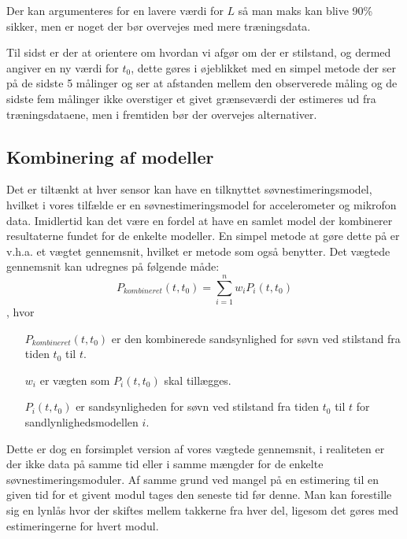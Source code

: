 Der kan argumenteres for en lavere værdi for $L$ så man maks kan blive 90\% sikker, men er noget der bør overvejes med mere træningsdata.

Til sidst er der at orientere om hvordan vi afgør om der er stilstand, og dermed angiver en ny værdi for $t_0$, dette gøres i øjeblikket med en simpel metode der ser på de sidste 5 målinger og ser at afstanden mellem den observerede måling og de sidste fem målinger ikke overstiger et givet grænseværdi der estimeres ud fra træningsdataene, men i fremtiden bør der overvejes alternativer.

\subsection{Kombinering af modeller}
Det er tiltænkt at hver sensor kan have en tilknyttet søvnestimeringsmodel, hvilket i vores tilfælde er en søvnestimeringsmodel for accelerometer og mikrofon data.
Imidlertid kan det være en fordel at have en samlet model der kombinerer resultaterne fundet for de enkelte modeller.
En simpel metode at gøre dette på er v.h.a. et vægtet gennemsnit, hvilket er metode som \citet{6563918} også benytter.
Det vægtede gennemsnit kan udregnes på følgende måde:
\begin{equation}
	P_{kombineret}(t,t_0) = \sum_{i=1}^{n}{w_iP_i(t,t_0)}
\end{equation}
, hvor
\begin{itemize}
	\item[$P_{kombineret}(t,t_0)$] er den kombinerede sandsynlighed for søvn ved stilstand fra tiden $t_0$ til $t$.
	\item[$w_i$] er vægten som $P_i(t,t_0)$ skal tillægges.
	\item[$P_i(t,t_0)$] er sandsynligheden for søvn ved stilstand fra tiden $t_0$ til $t$ for sandlynlighedsmodellen $i$.
\end{itemize}
Dette er dog en forsimplet version af vores vægtede gennemsnit, i realiteten er der ikke data på samme tid eller i samme mængder for de enkelte søvnestimeringsmoduler.
Af samme grund ved mangel på en estimering til en given tid for et givent modul tages den seneste tid før denne.
Man kan forestille sig en lynlås hvor der skiftes mellem takkerne fra hver del, ligesom det gøres med estimeringerne for hvert modul.

